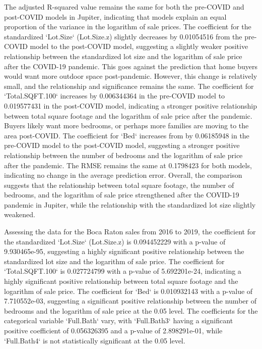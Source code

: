 \documentclass[12pt,english]{article}
\begin{document}
The adjusted R-squared value remains the same for both the pre-COVID and post-COVID models in Jupiter, indicating that models explain an equal proportion of the variance in the logarithm of sale prices. The coefficient for the standardized `Lot.Size` (Lot.Size.z) slightly decreases by 0.01054516 from the pre-COVID model to the post-COVID model, suggesting a slightly weaker positive relationship between the standardized lot size and the logarithm of sale price after the COVID-19 pandemic. This goes against the prediction that home buyers would want more outdoor space post-pandemic. However, this change is relatively small, and the relationship and significance remains the same. The coefficient for `Total.SQFT.100` increases by 0.006344364 in the pre-COVID model to 0.019577431 in the post-COVID model, indicating a stronger positive relationship between total square footage and the logarithm of sale price after the pandemic. Buyers likely want more bedrooms, or perhaps more families are moving to the area post-COVID. The coefficient for `Bed` increases from  by 0.06185948 in the pre-COVID model to the post-COVID model, suggesting a stronger positive relationship between the number of bedrooms and the logarithm of sale price after the pandemic. The RMSE remains the same at 0.1798423 for both models, indicating no change in the average prediction error. Overall, the comparison suggests that the relationship between total square footage, the number of bedrooms, and the logarithm of sale price strengthened after the COVID-19 pandemic in Jupiter, while the relationship with the standardized lot size slightly weakened. 

Assessing the data for the Boca Raton sales from 2016 to 2019, the coefficient for the standardized `Lot.Size` (Lot.Size.z) is 0.094452229 with a p-value of 9.930465e-95, suggesting a highly significant positive relationship between the standardized lot size and the logarithm of sale price. The coefficient for `Total.SQFT.100` is 0.027724799 with a p-value of 5.692201e-24, indicating a highly significant positive relationship between total square footage and the logarithm of sale price. The coefficient for `Bed` is 0.010932143 with a p-value of 7.710552e-03, suggesting a significant positive relationship between the number of bedrooms and the logarithm of sale price at the 0.05 level. The coefficients for the categorical variable `Full.Bath` vary, with `Full.Bath3` having a significant positive coefficient of 0.056326395 and a p-value of 2.898291e-01, while `Full.Bath4` is not statistically significant at the 0.05 level. 
\end{document}
